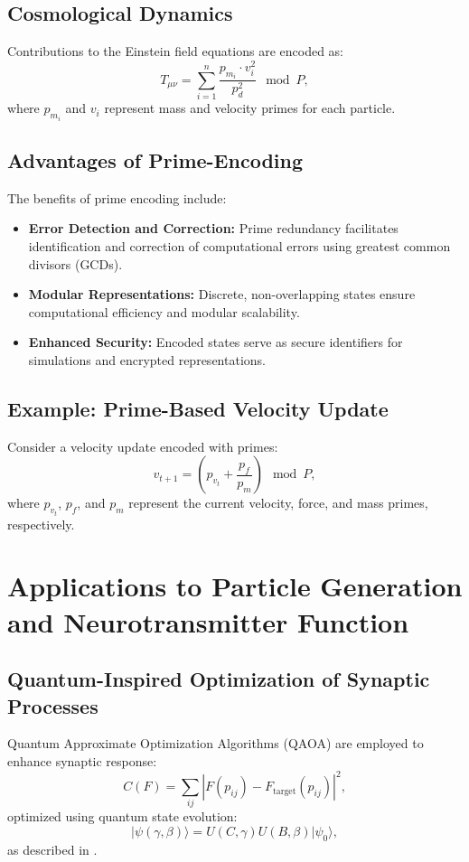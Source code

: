 \documentclass{article}
\theoremstyle{plain}
\begin{document}
\subsection{Cosmological Dynamics}
Contributions to the Einstein field equations are encoded as:
\begin{equation}
T_{\mu \nu} = \sum_{i=1}^n \frac{p_{m_i} \cdot v_i^2}{p_d^2} \mod P,
\end{equation}
where \(p_{m_i}\) and \(v_i\) represent mass and velocity primes for each particle.

\subsection{Advantages of Prime-Encoding}
The benefits of prime encoding include:
\begin{itemize}
    \item \textbf{Error Detection and Correction:} Prime redundancy facilitates identification and correction of computational errors using greatest common divisors (GCDs).
    \item \textbf{Modular Representations:} Discrete, non-overlapping states ensure computational efficiency and modular scalability.
    \item \textbf{Enhanced Security:} Encoded states serve as secure identifiers for simulations and encrypted representations.
\end{itemize}

\subsection{Example: Prime-Based Velocity Update}
Consider a velocity update encoded with primes:
\begin{equation}
v_{t+1} = \left( p_{v_t} + \frac{p_f}{p_m} \right) \mod P,
\end{equation}
where \(p_{v_t}\), \(p_f\), and \(p_m\) represent the current velocity, force, and mass primes, respectively.
\section{Applications to Particle Generation and Neurotransmitter Function}
\subsection{Quantum-Inspired Optimization of Synaptic Processes}
Quantum Approximate Optimization Algorithms (QAOA) are employed to enhance synaptic response:
\begin{equation}
C(F) = \sum_{ij} |F(p_{ij}) - F_{\text{target}}(p_{ij})|^2,
\end{equation}
optimized using quantum state evolution:
\begin{equation}
|\psi(\gamma, \beta)\rangle = U(C, \gamma) U(B, \beta) |\psi_0\rangle,
\end{equation}
as described in \cite{QuantumOptimization2023}.
\end{document}

